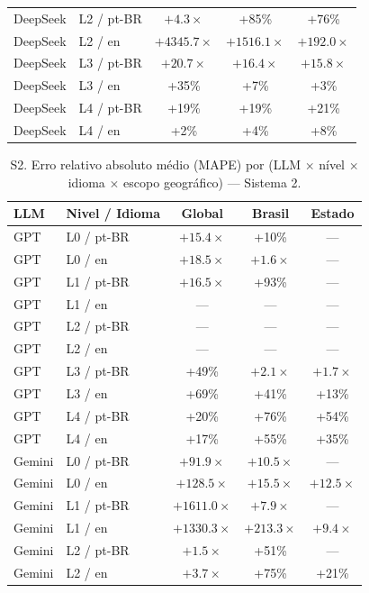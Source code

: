 \begin{table}[h]
\begin{tabular}{llccc}
DeepSeek & L2 / pt-BR & $+4.3\times$ & +85\% & +76\% \\
DeepSeek & L2 / en & $+4345.7\times$ & $+1516.1\times$ & $+192.0\times$ \\
DeepSeek & L3 / pt-BR & $+20.7\times$ & $+16.4\times$ & $+15.8\times$ \\
DeepSeek & L3 / en & +35\% & +7\% & +3\% \\
DeepSeek & L4 / pt-BR & +19\% & +19\% & +21\% \\
DeepSeek & L4 / en & +2\% & +4\% & +8\% \\
\bottomrule
\end{tabular}
\end{table}

\begin{table}[h]
\centering
\small
\caption{S2. Erro relativo absoluto m\'edio (MAPE) por (LLM $\times$ n\'ivel $\times$ idioma $\times$ escopo geogr\'afico) --- Sistema 2.}
\label{tab:sm_mape_s2}
\begin{tabular}{llccc}
\toprule
\textbf{LLM} & \textbf{Nivel / Idioma} & \textbf{Global} & \textbf{Brasil} & \textbf{Estado} \\
\midrule
GPT & L0 / pt-BR & $+15.4\times$ & +10\% & --- \\
GPT & L0 / en & $+18.5\times$ & $+1.6\times$ & --- \\
GPT & L1 / pt-BR & $+16.5\times$ & +93\% & --- \\
GPT & L1 / en & --- & --- & --- \\
GPT & L2 / pt-BR & --- & --- & --- \\
GPT & L2 / en & --- & --- & --- \\
GPT & L3 / pt-BR & +49\% & $+2.1\times$ & $+1.7\times$ \\
GPT & L3 / en & +69\% & +41\% & +13\% \\
GPT & L4 / pt-BR & +20\% & +76\% & +54\% \\
GPT & L4 / en & +17\% & +55\% & +35\% \\
\midrule
Gemini & L0 / pt-BR & $+91.9\times$ & $+10.5\times$ & --- \\
Gemini & L0 / en & $+128.5\times$ & $+15.5\times$ & $+12.5\times$ \\
Gemini & L1 / pt-BR & $+1611.0\times$ & $+7.9\times$ & --- \\
Gemini & L1 / en & $+1330.3\times$ & $+213.3\times$ & $+9.4\times$ \\
Gemini & L2 / pt-BR & $+1.5\times$ & +51\% & --- \\
Gemini & L2 / en & $+3.7\times$ & +75\% & +21\% \\

\end{tabular}
\end{table}
